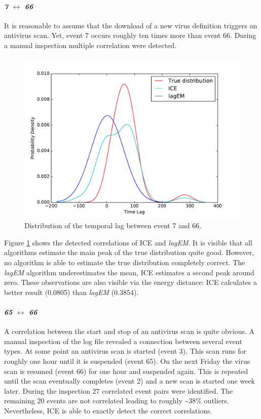 \documentclass[conference]{IEEEtran}
\theoremstyle{examplestyle}
\begin{document}
\paragraph{\textit{7} \(\leftrightarrow\) \textit{66}} It is reasonable to assume that the download of a new virus definition triggers an antivirus scan. Yet, event 7 occurs roughly ten times more than event 66. During a manual inspection multiple correlation were detected.

\begin{figure}[!htb]
	\centering
	\includegraphics[scale=0.4]{images/symantec/7-66.pdf}
	\caption{Distribution of the temporal lag between event 7 and 66.}
	\label{fig:7-66}
\end{figure}

Figure \ref{fig:7-66} shows the detected correlations of \ac{ICE} and \textit{lagEM}. It is visible that all algorithms estimate the main peak of the true distribution quite good. However, no algorithm is able to estimate the true distribution completely correct. The \textit{lagEM} algorithm underestimates the mean, \ac{ICE} estimates a second peak around zero. These observations are also visible via the energy distance: \ac{ICE} calculates a better result (0.0805) than \textit{lagEM} (0.3854).




\paragraph{\textit{65} \(\leftrightarrow\) \textit{66}} A correlation between the start and stop of an antivirus scan is quite obvious. A manual inspection of the log file revealed a connection between several event types. At some point an antivirus scan is started (event 3). This scan runs for roughly one hour until it is suspended (event 65). On the next Friday the virus scan is resumed (event 66) for one hour and suspended again. This is repeated until the scan eventually completes (event 2) and a new scan is started one week later. During the inspection 27 correlated event pairs were identified. The remaining 20 events are not correlated leading to roughly \textasciitilde 38\% outliers. Nevertheless, \ac{ICE} is able to exactly detect the correct correlations.
\end{document}
